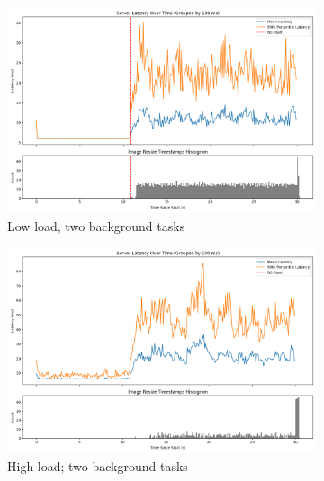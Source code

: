 \begin{figure}[t]
    \centering
    \begin{subfigure}[t]{0.32\textwidth}
        \includegraphics[width=\textwidth]{graphs/srv-lat-weight-low-two.png}
        \caption{Low load, two background tasks}\label{fig:srv-lat-weight-low-two}
    \end{subfigure}
    \hspace{\fill}
    \begin{subfigure}[t]{0.32\textwidth}
        \includegraphics[width=\textwidth]{graphs/srv-lat-weight-high-two.png}
        \caption{High load; two background tasks}\label{fig:srv-lat-weight-high-two}
    \end{subfigure}
    \hspace{\fill}
    \begin{subfigure}[t]{0.32\textwidth}

\end{subfigure}
\end{figure}
